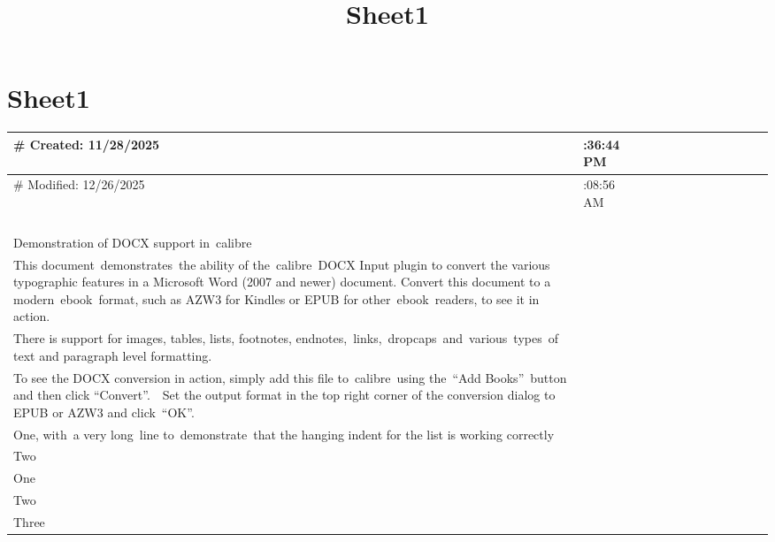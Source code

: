 \documentclass[\officeparserdriver 11pt]{article}
\title{Sheet1}
\date{}
\begin{document}
\section{Sheet1}

{\scriptsize\setlength{\tabcolsep}{2pt}
\begin{longtable}{|*{13}{>{\raggedright\arraybackslash}p{\dimexpr(\linewidth-26\tabcolsep-14\arrayrulewidth)/13\relax}|}}
\hline
\# Created: 11/28/2025 & 4:36:44 PM &  &  &  &  &  &  &  &  &  &  &  \\
\hline
\# Modified: 12/26/2025 & 11:08:56 AM &  &  &  &  &  &  &  &  &  &  &  \\
\hline
 &  &  &  &  &  &  &  &  &  &  &  &  \\
\hline
 &  &  &  &  &  &  &  &  &  &  &  &  \\
\hline
 &  &  &  &  &  &  &  &  &  &  &  &  \\
\hline
 &  &  &  &  &  &  &  &  &  &  &  &  \\
\hline
Demonstration of DOCX support in~calibre~ &  &  &  &  &  &  &  &  &  &  &  &  \\
\hline
This document~demonstrates~the ability of the~calibre~DOCX Input plugin to convert the various typographic features in a Microsoft Word (2007 and newer) document. Convert this document to a modern~ebook~format, such as AZW3 for Kindles or EPUB for other~ebook~readers, to see it in action.~ &  &  &  &  &  &  &  &  &  &  &  &  \\
\hline
There is support for images, tables, lists, footnotes, endnotes,~links,~dropcaps~and~various~types~of text and paragraph level formatting.~ &  &  &  &  &  &  &  &  &  &  &  &  \\
\hline
To see the DOCX conversion in action, simply add this file to~calibre~using the~“Add Books”~button and then click “Convert”.~~Set the output format in the top right corner of the conversion dialog to EPUB or AZW3 and click~“OK”.~ &  &  &  &  &  &  &  &  &  &  &  &  \\
\hline
One, with~a very long~line to~demonstrate~that the hanging indent for the list is working correctly~ &  &  &  &  &  &  &  &  &  &  &  &  \\
\hline
Two~ &  &  &  &  &  &  &  &  &  &  &  &  \\
\hline
One~ &  &  &  &  &  &  &  &  &  &  &  &  \\
\hline
Two~ &  &  &  &  &  &  &  &  &  &  &  &  \\
\hline
Three~ &  &  &  &  &  &  &  &  &  &  &  &  \\

\end{longtable}}
\end{document}
